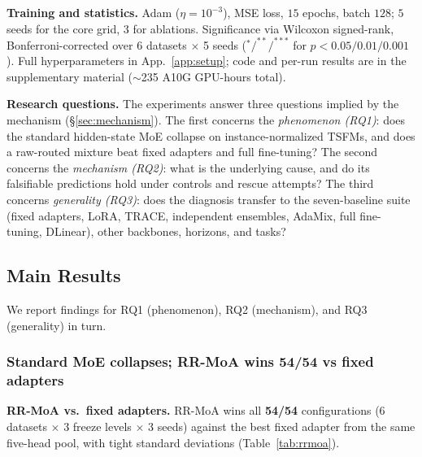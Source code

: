 \documentclass{article}
\begin{document}
\textbf{Training and statistics.} Adam ($\eta{=}10^{-3}$), MSE loss, $15$ epochs, batch $128$; $5$ seeds for the core grid, $3$ for ablations. Significance via Wilcoxon signed-rank, Bonferroni-corrected over 6 datasets $\times$ 5 seeds ($^{*}\!/^{**}\!/^{***}$ for $p{<}0.05/0.01/0.001$). Full hyperparameters in App.~\ref{app:setup}; code and per-run results are in the supplementary material ($\sim$235 A10G GPU-hours total).

\textbf{Research questions.} The experiments answer three questions implied by the mechanism (\S\ref{sec:mechanism}). The first concerns the \emph{phenomenon (RQ1)}: does the standard hidden-state MoE collapse on instance-normalized TSFMs, and does a raw-routed mixture beat fixed adapters and full fine-tuning? The second concerns the \emph{mechanism (RQ2)}: what is the underlying cause, and do its falsifiable predictions hold under controls and rescue attempts? The third concerns \emph{generality (RQ3)}: does the diagnosis transfer to the seven-baseline suite (fixed adapters, LoRA, TRACE, independent ensembles, AdaMix, full fine-tuning, DLinear), other backbones, horizons, and tasks?

\subsection{Main Results}
\label{sec:main_results}

We report findings for RQ1 (phenomenon), RQ2 (mechanism), and RQ3 (generality) in turn.

\subsubsection*{Standard MoE collapses; RR-MoA wins 54/54 vs fixed adapters}

{ \textbf{RR-MoA vs.\ fixed adapters.} RR-MoA wins all \textbf{54/54} configurations (6 datasets $\times$ 3 freeze levels $\times$ 3 seeds) against the best fixed adapter from the same five-head pool, with tight standard deviations (Table~\ref{tab:rrmoa}).}
\end{document}
